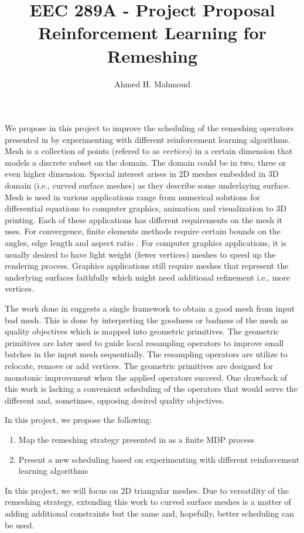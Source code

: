 \documentclass[12pt]{article}
\begin{document}
\title{EEC 289A - Project Proposal \\ Reinforcement Learning for Remeshing}
\author{Ahmed H. Mahmoud}
\date{} 

\maketitle

We propose in this project to improve the scheduling of the remeshing operators presented in \cite{Abdelkader:2017:ACR} by experimenting with different reinforcement learning algorithms. Mesh is a collection of points (refered to as \emph{vertices}) in a certain dimension that models a discrete subset on the domain. The domain could be in two, three or even higher dimension. Special interest arises in 2D meshes embedded in 3D domain (i.e., curved surface meshes) as they describe some underlaying surface. Mesh is used in various applications range from numerical solutions for differential equations to computer graphics, animation and visualization to 3D printing. Each of these applications has different requirements on the mesh it uses. For convergence, finite elements methods require certain bounds on the angles, edge length and aspect ratio \cite{shewchuk2002good}. For computer graphics applications, it is usually desired to have light weight (fewer vertices) meshes to speed up the rendering process. Graphics applications still require meshes that represent the underlying surfaces faithfully which might need additional refinement i.e., more vertices.

The work done in \cite{Abdelkader:2017:ACR} suggests a single framework to obtain a good mesh from input bad mesh. This is done by interpreting the goodness or badness of the mesh as quality objectives which is mapped into geometric primitives. The geometric primitives are later used to guide local resampling operators to improve small batches in the input mesh sequentially. The resampling operators are utilize to relocate, remove or add vertices. The geometric primitives are designed for monotonic improvement when the applied operators succeed. One drawback of this work is lacking a convenient scheduling of the operators that would serve the different and, sometimes, opposing desired quality objectives. 

In this project, we propose the following:
\begin{enumerate}

\item Map the remeshing strategy presented in \cite{Abdelkader:2017:ACR} as a finite MDP process
\item Present a new scheduling based on experimenting with different reinforcement learning algorithms
\end{enumerate}
In this project, we will focus on 2D triangular meshes. Due to versatility of the remeshing strategy, extending this work to curved surface meshes is a matter of adding additional constraints but the same and, hopefully, better scheduling can be used. 



\end{document}
